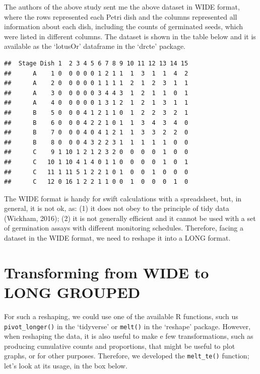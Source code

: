 \documentclass[
]{book}
\begin{document}
The authors of the above study sent me the above dataset in WIDE format, where the rows represented each Petri dish and the columns represented all information about each dish, including the counts of germinated seeds, which were listed in different columns. The dataset is shown in the table below and it is available as the `lotusOr' dataframe in the `drcte' package.

\begin{verbatim}
##  Stage Dish 1  2 3 4 5 6 7 8 9 10 11 12 13 14 15
##      A    1 0  0 0 0 0 1 2 1 1  1  3  1  1  4  2
##      A    2 0  0 0 0 0 1 1 1 1  2  1  2  3  1  1
##      A    3 0  0 0 0 0 3 4 4 3  1  2  1  1  0  1
##      A    4 0  0 0 0 0 1 3 1 2  1  2  1  3  1  1
##      B    5 0  0 0 4 1 2 1 1 0  1  2  2  3  2  1
##      B    6 0  0 0 4 2 2 1 0 1  1  3  4  3  4  0
##      B    7 0  0 0 4 0 4 1 2 1  1  3  3  2  2  0
##      B    8 0  0 0 4 3 2 2 3 1  1  1  1  1  0  0
##      C    9 1 10 1 2 1 2 3 2 0  0  0  0  1  0  0
##      C   10 1 10 4 1 4 0 1 1 0  0  0  0  1  0  1
##      C   11 1 11 5 1 2 2 1 0 1  0  0  1  0  0  0
##      C   12 0 16 1 2 2 1 1 0 0  1  0  0  0  1  0
\end{verbatim}

The WIDE format is handy for swift calculations with a spreadsheet, but, in general, it is not ok, as: (1) it does not obey to the principle of tidy data (Wickham, 2016); (2) it is not generally efficient and it cannot be used with a set of germination assays with different monitoring schedules. Therefore, facing a dataset in the WIDE format, we need to reshape it into a LONG format.

\hypertarget{transforming-from-wide-to-long-grouped}{%
\section{Transforming from WIDE to LONG GROUPED}\label{transforming-from-wide-to-long-grouped}}

For such a reshaping, we could use one of the available R functions, such us \texttt{pivot\_longer()} in the `tidyverse' or \texttt{melt()} in the `reshape' package. However, when reshaping the data, it is also useful to make e few transformations, such as producing cumulative counts and proportions, that might be useful to plot graphs, or for other purposes. Therefore, we developed the \texttt{melt\_te()} function; let's look at its usage, in the box below.
\end{document}
